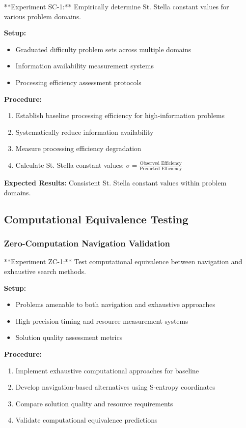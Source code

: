 \documentclass[12pt,a4paper]{article}
\begin{document}
**Experiment SC-1:** Empirically determine St. Stella constant values for various problem domains.

\textbf{Setup:}
\begin{itemize}
\item Graduated difficulty problem sets across multiple domains
\item Information availability measurement systems
\item Processing efficiency assessment protocols
\end{itemize}

\textbf{Procedure:}
\begin{enumerate}
\item Establish baseline processing efficiency for high-information problems
\item Systematically reduce information availability
\item Measure processing efficiency degradation
\item Calculate St. Stella constant values: $\sigma = \frac{\text{Observed Efficiency}}{\text{Predicted Efficiency}}$
\end{enumerate}

\textbf{Expected Results:} Consistent St. Stella constant values within problem domains.

\subsection{Computational Equivalence Testing}

\subsubsection{Zero-Computation Navigation Validation}

**Experiment ZC-1:** Test computational equivalence between navigation and exhaustive search methods.

\textbf{Setup:}
\begin{itemize}
\item Problems amenable to both navigation and exhaustive approaches
\item High-precision timing and resource measurement systems
\item Solution quality assessment metrics
\end{itemize}

\textbf{Procedure:}
\begin{enumerate}
\item Implement exhaustive computational approaches for baseline
\item Develop navigation-based alternatives using S-entropy coordinates
\item Compare solution quality and resource requirements
\item Validate computational equivalence predictions
\end{enumerate}
\end{document}
